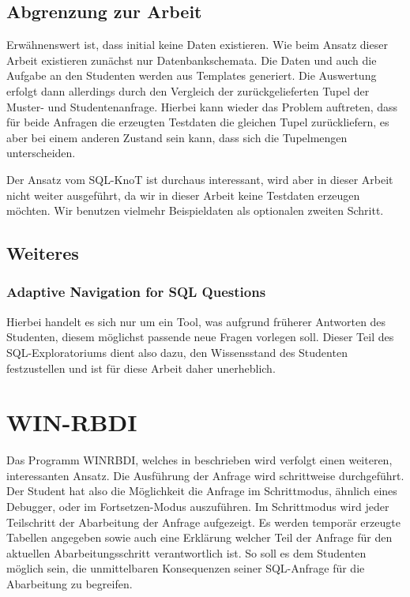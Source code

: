 \subsection*{Abgrenzung zur Arbeit}

Erwähnenswert ist, dass initial keine Daten existieren. Wie beim Ansatz dieser Arbeit existieren zunächst nur Datenbankschemata. Die Daten und auch die Aufgabe an den Studenten werden aus Templates generiert. Die Auswertung erfolgt dann allerdings durch den Vergleich der zurückgelieferten Tupel der Muster- und Studentenanfrage. Hierbei kann wieder das Problem auftreten, dass für beide Anfragen die erzeugten Testdaten die gleichen Tupel zurückliefern, es aber bei einem anderen Zustand sein kann, dass sich die Tupelmengen unterscheiden. 

Der Ansatz vom SQL-KnoT ist durchaus interessant, wird aber in dieser Arbeit nicht weiter ausgeführt, da wir in dieser Arbeit keine Testdaten erzeugen möchten. Wir benutzen vielmehr Beispieldaten als optionalen zweiten Schritt.

\subsection{Weiteres}

\subsubsection{Adaptive Navigation for SQL Questions}

Hierbei handelt es sich nur um ein Tool, was aufgrund früherer Antworten des Studenten, diesem möglichst passende neue Fragen vorlegen soll. Dieser Teil des SQL-Exploratoriums dient also dazu, den Wissensstand des Studenten festzustellen und ist für diese Arbeit daher unerheblich. 

\section{WIN-RBDI}

Das Programm WINRBDI, welches in \cite{winrbdi1} beschrieben wird verfolgt einen weiteren, interessanten Ansatz.  Die Ausführung der Anfrage wird schrittweise durchgeführt. Der Student hat also die Möglichkeit die Anfrage im Schrittmodus, ähnlich eines Debugger, oder im Fortsetzen-Modus auszuführen. Im Schrittmodus wird jeder Teilschritt der Abarbeitung der Anfrage aufgezeigt. Es werden temporär erzeugte Tabellen angegeben sowie auch eine Erklärung welcher Teil der Anfrage für den aktuellen Abarbeitungsschritt verantwortlich ist. So soll es dem Studenten möglich sein, die unmittelbaren Konsequenzen seiner SQL-Anfrage für die Abarbeitung zu begreifen. 

